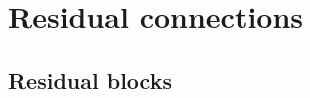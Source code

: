 \documentclass[11pt,aspectratio=169]{beamer}
\begin{document}
\section{Residual connections}
\subsection{Residual blocks}

\end{document}
